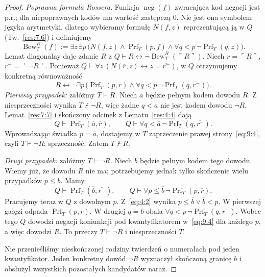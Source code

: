 \documentclass[11pt,a4paper]{article}
\numberwithin{equation}{section}
\theoremstyle{plain}
\theoremstyle{definition}
\theoremstyle{remark}
\begin{document}
\begin{proof}
\emph{Poprawna formuła Rossera.} Funkcja $\operatorname{neg}(f)$ zwracająca kod negacji jest p.r.; dla niepoprawnych kodów ma wartość zastępczą $0$. Nie jest ona symbolem języka arytmetyki, dlatego wybieramy formułę $N(f,z)$ reprezentującą ją w $Q$ (Tw.~\ref{res:7:6}) i definiujemy
\[
\operatorname{Bew}_T^{R}(f):=\exists z\,\exists p\,
\bigl(N(f,z)\land\operatorname{Prf}_T(p,f)\land\forall q<p\,\neg\operatorname{Prf}_T(q,z)\bigr).
\]
Lemat diagonalny daje zdanie $R$ z $Q\vdash R\leftrightarrow\neg\operatorname{Bew}_T^R(\ulcorner R\urcorner)$. Niech $r=\ulcorner R\urcorner$, $r^-=\ulcorner\neg R\urcorner$. Ponieważ $Q\vdash\forall z\,(N(\overline r,z)\leftrightarrow z=\overline{r^-})$, w $Q$ otrzymujemy konkretną równoważność
\begin{equation}\label{eq:9:4}
R\leftrightarrow\neg\exists p\,
\bigl(\operatorname{Prf}_T(p,\overline r)\land
\forall q<p\,\neg\operatorname{Prf}_T(q,\overline{r^-})\bigr).
\end{equation}
\emph{Pierwszy przypadek:} załóżmy $T\vdash R$. Niech $a$ będzie pełnym kodem dowodu $R$. Z niesprzeczności wynika $T\nvdash\neg R$, więc żadne $q<a$ nie jest kodem dowodu $\neg R$. Lemat~\ref{res:7:7} i skończony odcinek z Lematu~\ref{res:4:4} dają
\[
Q\vdash\operatorname{Prf}_T(\overline a,\overline r),\qquad
Q\vdash\forall q<\overline a\,\neg\operatorname{Prf}_T(q,\overline{r^-}).
\]
Wprowadzając świadka $p=\overline a$, dostajemy w $T$ zaprzeczenie prawej strony~\eqref{eq:9:4}, czyli $T\vdash\neg R$: sprzeczność. Zatem $T\nvdash R$.

\emph{Drugi przypadek:} załóżmy $T\vdash\neg R$. Niech $b$ będzie pełnym kodem tego dowodu. Wiemy już, że dowodu $R$ nie ma; potrzebujemy jednak tylko skończenie wielu przypadków $p\le b$. Mamy
\[
Q\vdash\operatorname{Prf}_T(\overline b,\overline{r^-}),\qquad
Q\vdash\forall p\le\overline b\,\neg\operatorname{Prf}_T(p,\overline r).
\]
Pracujemy teraz w $Q$ z dowolnym $p$. Z~\eqref{eq:4:2} wynika $p\le\overline b\lor\overline b<p$. W pierwszej gałęzi odpada $\operatorname{Prf}_T(p,\overline r)$. W drugiej $q=\overline b$ obala $\forall q<p\,\neg\operatorname{Prf}_T(q,\overline{r^-})$. Wobec tego $Q$ dowodzi negacji koniunkcji pod kwantyfikatorem w~\eqref{eq:9:4} dla każdego $p$, a więc dowodzi $R$. To przeczy $T\vdash\neg R$ i niesprzeczności $T$.

Nie przenieśliśmy nieskończonej rodziny twierdzeń o numerałach pod jeden kwantyfikator. Jeden konkretny dowód $\neg R$ wyznaczył skończoną granicę $b$ i obsłużył wszystkich pozostałych kandydatów naraz.
\end{proof}
\end{document}
